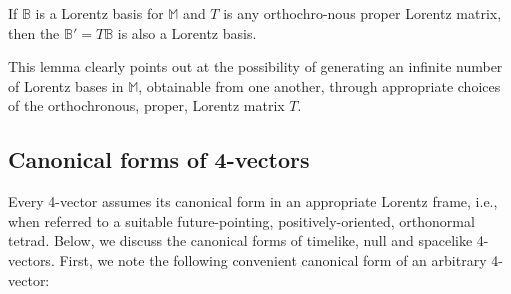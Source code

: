 \Lem If $\mathbb{B}$ is a Lorentz basis for 
$\mathbb{M}$ and $T$ is any orthochro-\break nous proper 
Lorentz matrix, then the $\mathbb{B}'= T \mathbb{B}$ is 
also a Lorentz basis.

This lemma clearly points out at the possibility of  
generating an infinite number of Lorentz bases in 
$\mathbb{M}$,  obtainable from one another, through 
appropriate choices of the {orthochronous, proper, 
Lorentz matrix} $T$.

\subsection{Canonical forms of 4-vectors}
 
Every 4-vector assumes its canonical form in an  
appropriate  Loren\break tz frame, i.e., when referred to a 
suitable future-pointing, positive\break ly-oriented, 
orthonormal  tetrad. Below, we discuss the canonical 
forms of  timelike, null  and  spacelike 4-vectors. 
First, we note the following convenient canonical form 
of an arbitrary 4-vector:

